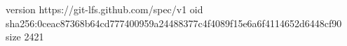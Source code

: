 version https://git-lfs.github.com/spec/v1
oid sha256:0ceac87368b64cd777400959a24488377c4f4089f15e6a6f4114652d6448cf90
size 2421

